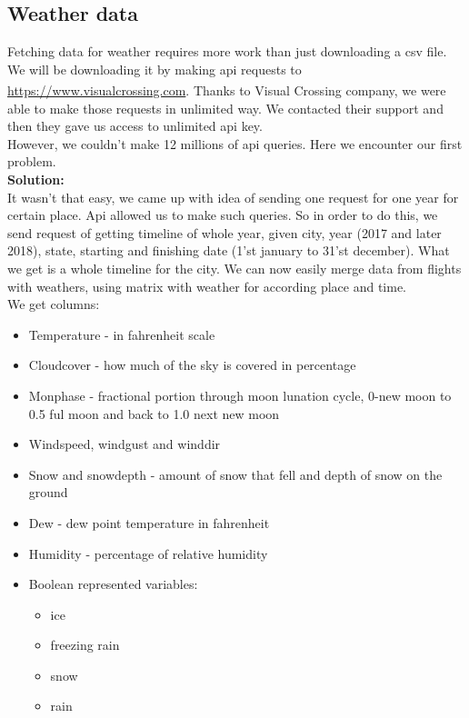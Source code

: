 \documentclass{article}
\begin{document}
	\subsection{Weather data}
		Fetching data for weather requires more work than just downloading a csv file.
		We will be downloading it by making api requests to \url{https://www.visualcrossing.com}.
		Thanks to Visual Crossing\textsuperscript{\tiny\textregistered} company, we were able to make those requests in unlimited way.
		We contacted their support and then they gave us access to unlimited api key. 	\\
		However, we couldn't make 12 millions of api queries. Here we encounter
		our first problem.\\
		\textbf{Solution:}\\
		It wasn't that easy, we came up with idea of sending one request for one year for certain place.
		Api allowed us to make such queries.  So in order to do this, we send request of getting timeline of whole year,
		given city, year (2017 and later 2018), state, starting and finishing date (1'st january to 31'st december). What we get is a whole 					timeline
		for the city. We can now easily merge data from flights with weathers, using matrix with weather for 
		according place and time.\\

		We get columns:

			\begin{itemize}
\item Temperature - in fahrenheit scale
\item Cloudcover - how much of the sky is covered in percentage
\item Monphase - fractional portion through moon lunation cycle, 0-new moon to 0.5 ful moon and back to 1.0 next new moon
\item Windspeed, windgust and winddir
\item Snow and snowdepth - amount of snow that fell and depth of snow on the ground
\item Dew - dew point temperature in fahrenheit
\item Humidity - percentage of relative humidity
\item Boolean represented variables:
	\begin{itemize}
		\item ice
		\item freezing rain
		\item snow
		\item rain
	\end{itemize}
				
			\end{itemize}
\end{document}
